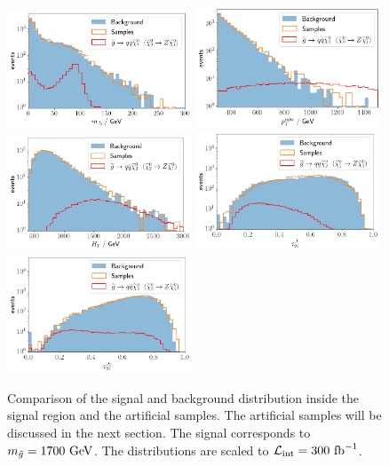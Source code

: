 \documentclass[prd, twocolumn, superscriptaddress,floatfix, nofootinbib, preprintnumbers]{revtex4-2}
\begin{document}
\begin{figure}[ht!]
    \centering
    \includegraphics[width=0.49\textwidth]{Mj2.png}
    \includegraphics[width=0.49\textwidth]{PTMiss.png}
    \includegraphics[width=0.49\textwidth]{HT.png}
    \includegraphics[width=0.49\textwidth]{TauJ1.png}
    \includegraphics[width=0.49\textwidth]{TauJ2.png}
    \caption{Comparison of the signal and background distribution inside the signal region and the artificial samples. The artificial samples will be discussed in the next section. The signal corresponds to $m_{\tilde{g}}=1700~{\rm GeV}$. The distributions are scaled to $\mathcal{L}_\text{int}=300~{\rm fb}^{-1}$.}
\label{fig:SampledEvents}
\end{figure}
\end{document}
